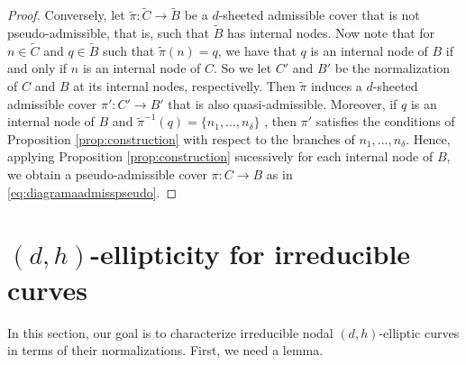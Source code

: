 \documentclass{article}
\renewcommand{\:}{\colon }
\begin{document}
\begin{proof}
Conversely, let $\widetilde {\pi}:\widetilde {C} \rightarrow \widetilde {B}$ be a $d$-sheeted admissible cover that is not pseudo-admissible, that is, such that $\widetilde B$ has internal nodes. 
Now note that for $n\in \widetilde C$ and $q\in\widetilde B$ such that $\widetilde \pi(n)=q$, we have that $q$ is an internal node of $B$ if and only if $n$ is an internal node of $C$.
So we let $C'$ and $B'$  be the normalization of $C$ and $B$ at its internal nodes, respectivelly. 
Then $\widetilde \pi$ induces a $d$-sheeted admissible cover $\pi':C'\rightarrow B'$ that is also quasi-admissible. 
Moreover, if $q$ is an internal node of $B$ and $\widetilde \pi^{-1}(q)=\{n_1,\ldots,n_\delta\}$ , then 
$\pi'$ satisfies the conditions of Proposition \ref{prop:construction} with respect to the branches of $n_1,\ldots,n_\delta$.
Hence, applying
Proposition \ref{prop:construction} sucessively for each internal node of $B$, 
we obtain a pseudo-admissible cover $\pi\:C\rightarrow B$ as in \eqref{eq:diagramaadmisspseudo}.
\end{proof}



\section{$(d,h)$-ellipticity for irreducible curves}\label{sec:irred}

In this section, our goal is to characterize irreducible nodal $(d,h)$-elliptic curves in terms of their normalizations.
First, we need a lemma.
\end{document}
